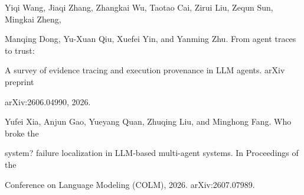 \begin{flushleft}
\par\smallskip
\noindent [39] Yiqi Wang, Jiaqi Zhang, Zhangkai Wu, Taotao Cai, Zirui Liu, Zequn Sun, Mingkai Zheng,\par
\noindent  Manqing Dong, Yu-Xuan Qiu, Xuefei Yin, and Yanming Zhu. From agent traces to trust:\par
\noindent  A survey of evidence tracing and execution provenance in LLM agents. arXiv preprint\par
\noindent  arXiv:2606.04990, 2026.\par
\par\smallskip
\noindent [40] Yufei Xia, Anjun Gao, Yueyang Quan, Zhuqing Liu, and Minghong Fang. Who broke the\par
\noindent  system? failure localization in LLM-based multi-agent systems. In Proceedings of the\par
\noindent  Conference on Language Modeling (COLM), 2026. arXiv:2607.07989.\par
\end{flushleft}
